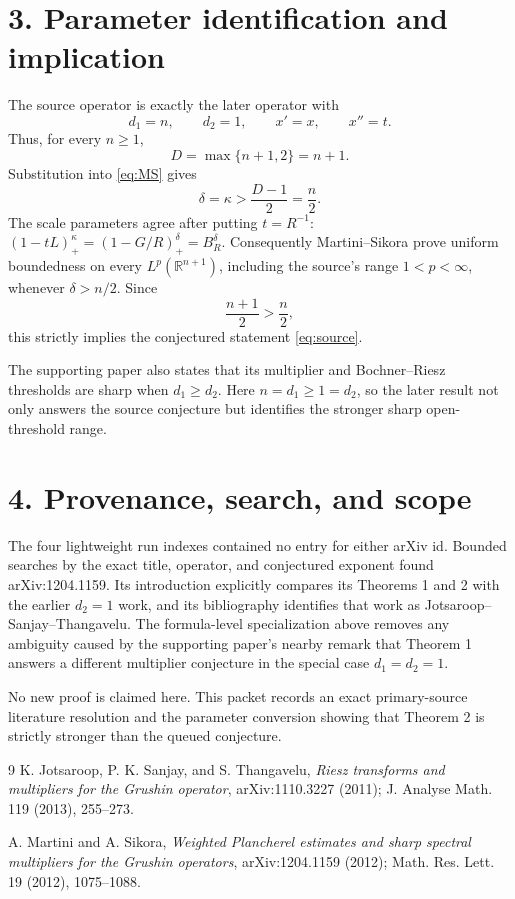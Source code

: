 \documentclass[11pt]{article}
\begin{document}
\clearpage
\section*{3. Parameter identification and implication}

The source operator is exactly the later operator with
\[
 d_1=n,\qquad d_2=1,\qquad x'=x,\qquad x''=t.
\]
Thus, for every $n\ge1$,
\[
 D=\max\{n+1,2\}=n+1.
\]
Substitution into \eqref{eq:MS} gives
\[
 \delta=\kappa>\frac{D-1}{2}=\frac n2.
\]
The scale parameters agree after putting $t=R^{-1}$:
$(1-tL)_+^\kappa=(1-G/R)_+^\delta=B_R^\delta$.
Consequently Martini--Sikora prove uniform boundedness on every
$L^p(\mathbb R^{n+1})$, including the source's range $1<p<\infty$, whenever
$\delta>n/2$. Since
\[
 \frac{n+1}{2}>\frac n2,
\]
this strictly implies the conjectured statement \eqref{eq:source}.

The supporting paper also states that its multiplier and Bochner--Riesz
thresholds are sharp when $d_1\ge d_2$.  Here $n=d_1\ge1=d_2$, so the later
result not only answers the source conjecture but identifies the stronger sharp
open-threshold range.

\section*{4. Provenance, search, and scope}

The four lightweight run indexes contained no entry for either arXiv id.
Bounded searches by the exact title, operator, and conjectured exponent found
arXiv:1204.1159. Its introduction explicitly compares its Theorems 1 and 2
with the earlier $d_2=1$ work, and its bibliography identifies that work as
Jotsaroop--Sanjay--Thangavelu.  The formula-level specialization above removes
any ambiguity caused by the supporting paper's nearby remark that Theorem 1
answers a different multiplier conjecture in the special case $d_1=d_2=1$.

No new proof is claimed here.  This packet records an exact primary-source
literature resolution and the parameter conversion showing that Theorem 2 is
strictly stronger than the queued conjecture.

\begin{thebibliography}{9}
K. Jotsaroop, P. K. Sanjay, and S. Thangavelu,
\emph{Riesz transforms and multipliers for the Grushin operator},
arXiv:1110.3227 (2011); J. Analyse Math. 119 (2013), 255--273.

A. Martini and A. Sikora,
\emph{Weighted Plancherel estimates and sharp spectral multipliers for the Grushin operators},
arXiv:1204.1159 (2012); Math. Res. Lett. 19 (2012), 1075--1088.
\end{thebibliography}
\end{document}
